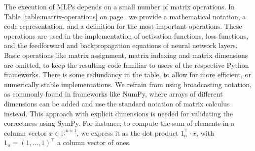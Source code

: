 \documentclass[twoside,11pt]{article}
\newcommand{\Reals}{\mathbb{R}}
\begin{document}
The execution of MLPs depends on a small number of matrix operations. In Table \ref{table:matrix-operations} on page~\pageref{table:matrix-operations} we provide a mathematical notation, a code representation, and a definition for the most important operations. These operations are used in the implementation of activation functions, loss functions, and the feedforward and backpropagation equations of neural network layers. Basic operations like matrix assignment, matrix indexing and matrix dimensions are omitted, to keep the resulting code familiar to users of the respective Python frameworks. There is some redundancy in the table, to allow for more efficient, or numerically stable implementations.
We refrain from using broadcasting notation, as commonly found in frameworks like NumPy, where arrays of different dimensions can be added and use the standard notation of matrix calculus instead.
This approach with explicit dimensions is needed for validating the correctness using SymPy.
For instance, to compute the sum of elements in a column vector $x \in \Reals^{n \times 1}$, we express it as the dot product $1_n^\top \cdot x$, with $1_n = (1, \ldots, 1)^\top$ a column vector of ones.
\end{document}
